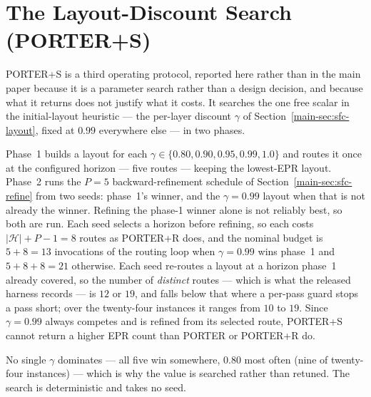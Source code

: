 \documentclass[journal]{IEEEtran}
\newcommand{\PORTER}{\textsc{PORTER}}
\newcommand{\mainInitialLayout}{Section~\ref{main-sec:sfc-layout}}
\newcommand{\mainRefine}{Section~\ref{main-sec:sfc-refine}}
\begin{document}
\section{The Layout-Discount Search (\PORTER{}+S)}
\label{app:layoutsearch}

\PORTER{}+S is a third operating protocol, reported here rather than in
the main paper because it is a parameter search rather than a design
decision, and because what it returns does not justify what it costs. It
searches the one free scalar in the initial-layout heuristic --- the
per-layer discount $\gamma$ of \mainInitialLayout{}, fixed at $0.99$
everywhere else --- in two phases.

Phase~1 builds a layout for each $\gamma\in\{0.80,0.90,0.95,0.99,1.0\}$
and routes it once at the configured horizon --- five routes --- keeping
the lowest-EPR layout. Phase~2 runs the $P{=}5$ backward-refinement
schedule of \mainRefine{} from two seeds: phase~1's winner, and the
$\gamma{=}0.99$ layout when that is not already the winner. Refining the
phase-1 winner alone is not reliably best, so both are run. Each seed
selects a horizon before refining, so each costs
$\lvert\mathcal{H}\rvert+P-1=8$ routes as \PORTER{}+R does, and the
nominal budget is $5+8=13$ invocations of the routing loop when
$\gamma{=}0.99$ wins phase~1 and $5+8+8=21$ otherwise. Each seed
re-routes a layout at a horizon phase~1 already covered, so the
number of \emph{distinct} routes --- which is what the released harness
records --- is $12$ or $19$, and falls below that where a per-pass guard
stops a pass short; over the twenty-four instances it ranges from $10$
to $19$. Since $\gamma{=}0.99$ always competes and is refined from
its selected route, \PORTER{}+S cannot return a higher EPR count than
\PORTER{} or \PORTER{}+R do.

No single $\gamma$ dominates --- all five win somewhere, $0.80$ most
often (nine of twenty-four instances) --- which is why the value is
searched rather than retuned. The search is deterministic and takes no
seed.
\end{document}
